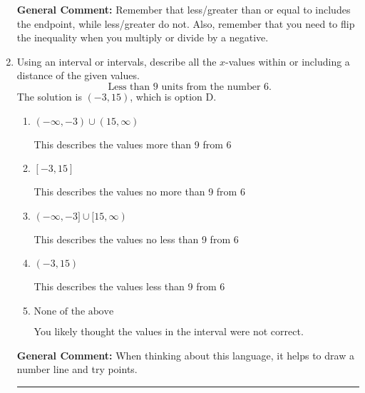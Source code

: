 \documentclass{extbook}[14pt]
\newcommand{\litem}[1]{\item #1

\rule{\textwidth}{0.4pt}}
\begin{document}
\begin{enumerate}
{\textbf{General Comment:} Remember that less/greater than or equal to includes the endpoint, while less/greater do not. Also, remember that you need to flip the inequality when you multiply or divide by a negative.
}
\litem{
Using an interval or intervals, describe all the $x$-values within or including a distance of the given values.
\[ \text{ Less than } 9 \text{ units from the number } 6. \]The solution is \( (-3, 15) \), which is option D.\begin{enumerate}[label=\Alph*.]
\item \( (-\infty, -3) \cup (15, \infty) \)

This describes the values more than 9 from 6
\item \( [-3, 15] \)

This describes the values no more than 9 from 6
\item \( (-\infty, -3] \cup [15, \infty) \)

This describes the values no less than 9 from 6
\item \( (-3, 15) \)

This describes the values less than 9 from 6
\item \( \text{None of the above} \)

You likely thought the values in the interval were not correct.
\end{enumerate}

\textbf{General Comment:} When thinking about this language, it helps to draw a number line and try points.
}
\end{enumerate}
\end{document}
